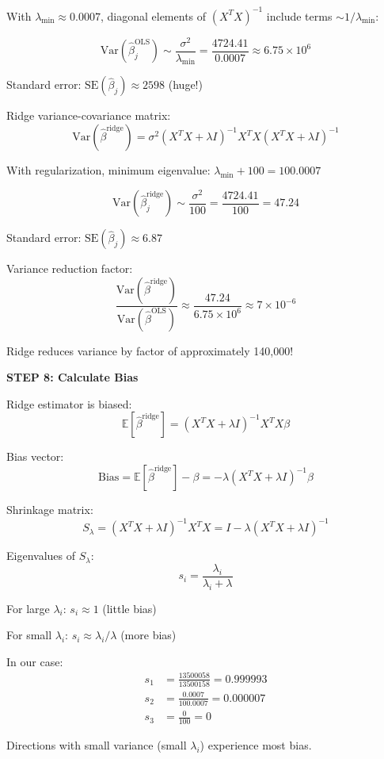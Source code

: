 \documentclass[12pt]{article}
\begin{document}
\begin{solution}
With $\lambda_{\min} \approx 0.0007$, diagonal elements of $(X^TX)^{-1}$ include terms $\sim 1/\lambda_{\min}$:

\[\text{Var}(\hat{\beta}_j^{\text{OLS}}) \sim \frac{\sigma^2}{\lambda_{\min}} = \frac{4724.41}{0.0007} \approx 6.75 \times 10^{6}\]

Standard error: $\text{SE}(\hat{\beta}_j) \approx 2598$ (huge!)

Ridge variance-covariance matrix:
\[\text{Var}(\hat{\beta}^{\text{ridge}}) = \sigma^2(X^TX + \lambda I)^{-1}X^TX(X^TX + \lambda I)^{-1}\]

With regularization, minimum eigenvalue: $\lambda_{\min} + 100 = 100.0007$

\[\text{Var}(\hat{\beta}_j^{\text{ridge}}) \sim \frac{\sigma^2}{100} = \frac{4724.41}{100} = 47.24\]

Standard error: $\text{SE}(\hat{\beta}_j) \approx 6.87$

Variance reduction factor:
\[\frac{\text{Var}(\hat{\beta}^{\text{ridge}})}{\text{Var}(\hat{\beta}^{\text{OLS}})} \approx \frac{47.24}{6.75 \times 10^{6}} \approx 7 \times 10^{-6}\]

Ridge reduces variance by factor of approximately 140,000!

\textbf{STEP 8: Calculate Bias}

Ridge estimator is biased:
\[\mathbb{E}[\hat{\beta}^{\text{ridge}}] = (X^TX + \lambda I)^{-1}X^TX\beta\]

Bias vector:
\[\text{Bias} = \mathbb{E}[\hat{\beta}^{\text{ridge}}] - \beta = -\lambda(X^TX + \lambda I)^{-1}\beta\]

Shrinkage matrix:
\[S_{\lambda} = (X^TX + \lambda I)^{-1}X^TX = I - \lambda(X^TX + \lambda I)^{-1}\]

Eigenvalues of $S_{\lambda}$:
\[s_i = \frac{\lambda_i}{\lambda_i + \lambda}\]

For large $\lambda_i$: $s_i \approx 1$ (little bias)

For small $\lambda_i$: $s_i \approx \lambda_i/\lambda$ (more bias)

In our case:
\begin{align*}
s_1 &= \frac{13500058}{13500158} = 0.999993 \\
s_2 &= \frac{0.0007}{100.0007} = 0.000007 \\
s_3 &= \frac{0}{100} = 0
\end{align*}

Directions with small variance (small $\lambda_i$) experience most bias.


\end{solution}
\end{document}
